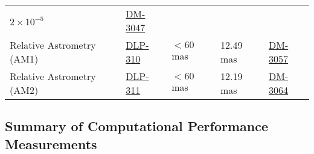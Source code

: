 \begin{longtable}[]{@{}lllll@{}}
\begin{minipage}[t]{0.17\columnwidth}
\(2\times 10^{-5}\)\strut
\end{minipage} & \begin{minipage}[t]{0.09\columnwidth}\raggedright\strut
\href{https://jira.lsstcorp.org/browse/DM-3047}{DM-3047}\strut
\end{minipage}\tabularnewline
\begin{minipage}[t]{0.30\columnwidth}\raggedright\strut
Relative Astrometry (AM1)\strut
\end{minipage} & \begin{minipage}[t]{0.09\columnwidth}\raggedright\strut
\href{https://jira.lsstcorp.org/browse/DLP-310}{DLP-310}\strut
\end{minipage} & \begin{minipage}[t]{0.20\columnwidth}\raggedright\strut
\(< 60\) mas\strut
\end{minipage} & \begin{minipage}[t]{0.17\columnwidth}\raggedright\strut
12.49 mas\strut
\end{minipage} & \begin{minipage}[t]{0.09\columnwidth}\raggedright\strut
\href{https://jira.lsstcorp.org/browse/DM-3057}{DM-3057}\strut
\end{minipage}\tabularnewline
\begin{minipage}[t]{0.30\columnwidth}\raggedright\strut
Relative Astrometry (AM2)\strut
\end{minipage} & \begin{minipage}[t]{0.09\columnwidth}\raggedright\strut
\href{https://jira.lsstcorp.org/browse/DLP-311}{DLP-311}\strut
\end{minipage} & \begin{minipage}[t]{0.20\columnwidth}\raggedright\strut
\(< 60\) mas\strut
\end{minipage} & \begin{minipage}[t]{0.17\columnwidth}\raggedright\strut
12.19 mas\strut
\end{minipage} & \begin{minipage}[t]{0.09\columnwidth}\raggedright\strut
\href{https://jira.lsstcorp.org/browse/DM-3064}{DM-3064}\strut
\end{minipage}\tabularnewline
\bottomrule
\end{longtable}

\subsection{Summary of Computational Performance
Measurements}\label{summary-of-computational-performance-measurements}

